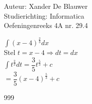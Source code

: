 \documentclass[a4paper]{article}
\begin{document}
\noindent \large Auteur: Xander De Blauwer \\
\noindent \large Studierichting: Informatica\\
\noindent \large Oefeningenreeks 4A nr. 29.4\\

\medskip

\normalsize


$ \displaystyle\int (x-4)^{\tfrac{2}{3}}dx $ \\

Stel $ t = x - 4 \Rightarrow dt = dx$ \\

$ \displaystyle\int t^{\tfrac{2}{3}}dt = \dfrac{3}{5}t^{\tfrac{5}{3}} + c $ \\

$ = \dfrac{3}{5}(x-4)^{\tfrac{5}{3}} + c $ \\


\begin{thebibliography}{999}
\end{thebibliography}
\end{document}
